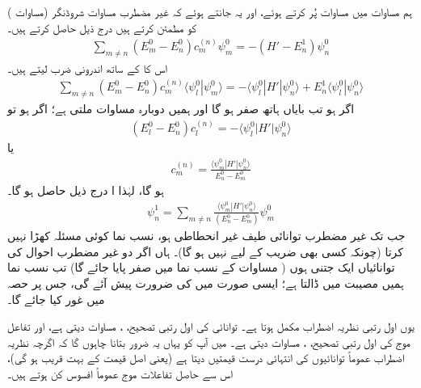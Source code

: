  ہم مساوات  میں مساوات  پُر کرتے ہوئے، اور یہ جانتے ہوئے کہ غیر مضطرب مساوات شروڈنگر (مساوات ) کو  مطمئن کرتے ہیں درج ذیل حاصل کرتے ہیں۔
\begin{align*}
\sum_{m \ne n} {(E_m^0 - E_n^0) c_m^{(n)} \psi_m^0} = - {(H' - E_n^1) \psi_n^0}
\end{align*}
اس کا  کے ساتھ اندرونی ضرب لیتے ہیں۔
\begin{align*}
\sum_{m \ne n} (E_m^0 - E_n^0) c_m^{(n)} \langle \psi_l^0 | \psi_m^0 \rangle = - \langle \psi_l^0 | H' | \psi_n^0 \rangle + E_n^1 \langle \psi_l^0 | \psi_n^0 \rangle 
\end{align*}
اگر  ہو تب بایاں ہاتھ صفر ہو گا اور ہمیں دوبارہ مساوات  ملتی ہے؛ اگر  ہو تو 
\begin{align*}
(E_l^0 - E_n^0) c_l^{(n)} = - \langle \psi_l^0 | H' | \psi_n^0 \rangle
\end{align*}
یا 
\begin{align}\label{مساوات_غیر_اضطراب_عددی_سر_ایم}
c_m^{(n)} = \frac{\langle \psi_m^0 | H' | \psi_n^0 \rangle}{E_n^0 - E_m^0}
\end{align}
ہو گا، لہٰذا ا درج ذیل حاصل ہو گا۔
\begin{align}\label{مساوات_غیر_اضطراب_تفاعل_این}
\psi_n^1 = \sum_{m \ne n} \frac{\langle \psi_m^0 | H' | \psi_n^0 \rangle}{(E_n^0 - E_m^0)} \psi_m^0
\end{align}
جب تک غیر مضطرب توانائی طیف غیر انحطاطی ہو، نسب نما کوئی مسئلہ کھڑا نہیں کرتا (چونکہ کسی بھی  ضریب  کے لیے  نہیں ہو گا)۔ ہاں اگر دو غیر مضطرب احوال کی توانائیاں ایک جتنی ہوں ( مساوات  کے نسب نما میں صفر پایا جائے گا) تب نسب نما ہمیں مصیبت میں ڈالتا ہے؛ ایسی صورت میں  کی ضرورت پیش آئے گی، جس پر حصہ  میں غور کیا جائے گا۔ 

 یوں اول رتبی نظریہ اضطراب مکمل ہوتا ہے۔ توانائی کی اول رتبی تصحیح، ، مساوات  دیتی ہے، اور تفاعل موج کی اول رتبی تصحیح، ، مساوات  دیتی ہے۔ میں آپ کو یہاں یہ ضرور بتانا چاہوں گا کہ اگرچہ نظریہ اضطراب عموماً توانائیوں کی انتہائی درست قیمتیں دیتا ہے (یعنی  اصل قیمت  کے بہت قریب ہو گی)، اس سے حاصل تفاعلات موج عموماً افسوس کن ہوتے ہیں۔ 

